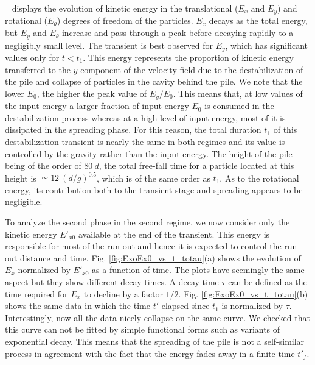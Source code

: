 ~ displays the evolution of kinetic energy 
in the translational ($E_x$ and $E_y$) and rotational ($E_\theta$) 
degrees of freedom of the particles. $E_x$ decays as the total 
energy, but $E_y$ and $E_\theta$ increase and pass through a peak before 
decaying rapidly to a negligibly small level. The transient is best observed 
for $E_y$, which has significant values only for $t< t_1$. This energy 
represents the proportion of kinetic energy transferred to the $y$ component of 
the velocity field  due to the destabilization of the pile and collapse of 
particles in the cavity behind the pile. We note that the lower $E_0$, the 
higher the peak value of $E_y/E_0$. 
This means that, at low values of the input energy a larger fraction 
of input energy $E_0$ is consumed in the destabilization process whereas 
at a high level of input energy, most of it is dissipated in the spreading 
phase. For this reason, the total duration $t_1$ of this destabilization 
transient is nearly the same in both regimes and its value is controlled by the 
gravity rather than the input energy. The height of the pile being of the order 
of $80 \ d$, the total free-fall time for a particle located at this height is 
$\simeq 12 \ (d/g)^{0.5}$, which is of the same order as $t_1$. As to the 
rotational energy, its contribution both to the transient stage and spreading 
appears to be negligible. 


To analyze the second phase in the second regime, we now consider only the 
kinetic energy $E'_{x0}$ available at the end of the transient. This energy 
is responsible for most of the run-out and hence it is expected to control the 
run-out distance and time. Fig. \ref{fig:ExoEx0_vs_t_totau}(a) shows the 
evolution of $E_x$ normalized by $E'_{x0}$ as a function of time. The plots 
have seemingly the same aspect but they show different decay times. A decay 
time $\tau$ can be defined as the time required for $E_x$ to decline by a 
factor $1/2$. Fig. \ref{fig:ExoEx0_vs_t_totau}(b) shows the same data in which 
the time $t'$ elapsed since $t_1$ is normalized by $\tau$. Interestingly, now 
all the data nicely collapse on the same curve. We checked that this curve can 
not be fitted by simple functional forms such as variants of exponential decay. 
This means that the spreading of the pile is not a self-similar process in 
agreement with the fact that the energy fades away in a finite time $t'_f$. 


